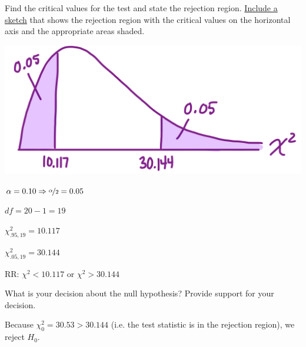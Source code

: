 \documentclass[noanswers]{exam}
\begin{document}
\begin{questions}
\begin{solution}[\stretch{1}]
	\vspace{1mm}
	
	\end{solution}
	
	\question Find the critical values for the test and state the rejection region. \underline{Include a sketch} that shows the rejection region with the critical values on the horizontal axis and the appropriate areas shaded.
	
	\vspace{-5mm}
	
	\begin{solution}[\stretch{1}]
	
	\begin{multicols}{2}
	
	\includegraphics[scale=0.09]{STAT_3090_LA18_chisq.JPEG}
    
    $\alpha=0.10 \Rightarrow \nicefrac{\alpha}{2}=0.05$
	
	$df=20-1=19$
	
	$\chi_{.95,19}^2=10.117$
	
	$\chi_{.05,19}^2=30.144$
	
	RR: $\chi^2<10.117$ or $\chi^2>30.144$
	
	
	\end{multicols}

	\end{solution}	
	
	\question What is your decision about the null hypothesis? Provide support for your decision.
	
	\begin{solution}[\stretch{1}]
	
	\vspace{1mm}
	
	Because $\chi_0^2=30.53>30.144$ (i.e. the test statistic is in the rejection region), we reject $H_0$. 
	
	\vspace{1mm}
	

\end{solution}
\end{questions}
\end{document}
